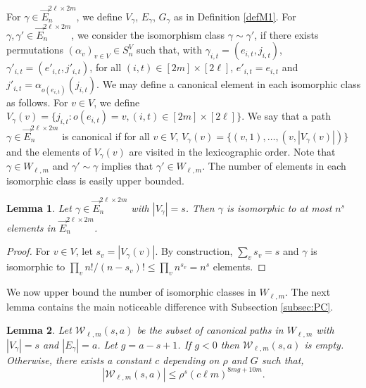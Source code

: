 \documentclass[11pt]{article}
\newtheorem{lemma}{Lemma}
\newcommand{\cW}{\mathcal {W}}
\newcommand{\1}{1\!\!{\sf I}}\newcommand{\IND}{\1}
\begin{document}
For $\gamma \in \vec E_n^{2 \ell \times 2m}$, we define $V_\gamma$, $E_\gamma$, $G_\gamma$ as in Definition \ref{defM1}.  For $\gamma, \gamma' \in \vec E_n^{2 \ell \times 2m}$, we consider the isomorphism class $\gamma \sim \gamma'$, if there exists permutations $(\alpha_v)_{v \in V} \in  S_n ^{V} $ such that, with $\gamma_{i,t} = (e_{i,t},j_{i,t})$, $\gamma'_{i,t} = (e'_{i,t},j'_{i,t})$,  for all $(i,t) \in [2m] \times [2\ell]$, $e'_{i,t} = e_{i,t}$ and $j'_{i,t} = \alpha_{o(e_{i,t})} ( j_{i,t})$.  We may define a canonical element in each isomorphic class as follows. For $v  \in V$, we define $V_\gamma (v) = \{ j_{i,t} : o(e_{i,t}) = v , (i,t) \in [2m] \times [2\ell] \}$.  We say that a path $\gamma \in \vec E_n^{2 \ell \times 2m}$ is canonical if for all $v \in V$, $V_\gamma (v)  = \{ (v,1), \ldots, (v,|V_\gamma(v)|) \}$  and the elements of $V_\gamma(v)$  are visited in the lexicographic order. Note that $\gamma \in W_{\ell,m}$ and $\gamma' \sim \gamma$ implies that $\gamma' \in W_{\ell,m}$. The number of elements in each isomorphic class is easily upper bounded.

\begin{lemma}\label{leM:isopath}
Let $\gamma \in \vec E_n^{2 \ell \times 2m}$ with $|V_\gamma| = s $. Then $\gamma$  is isomorphic to at most 
$
  n^s
$ 
elements in $\vec E_n^{2 \ell \times 2m}$.  
\end{lemma}

\begin{proof}
For $v \in V$, let $s_v = |V_\gamma (v)|$. By construction, $\sum_v s_v = s$ and $\gamma$ is isomorphic to 
$
\prod_v  n ! /(n - s_v) !   \leq \prod_v n^{s_v} = n ^s
$
elements.
\end{proof}


We now upper bound the number of isomorphic classes in $W_{\ell,m}$. The next lemma contains the main noticeable difference with Subsection \ref{subsec:PC}.

\begin{lemma}\label{leM:enumpath}
Let $\cW_{\ell,m} (s,a) $ be the subset of canonical paths in $W_{\ell,m}$ with $|V_\gamma| = s$ and $|E_\gamma |= a$. Let $g = a - s +1$. If $g < 0$ then $\cW_{\ell,m} (s,a)$ is empty. Otherwise,  there exists a constant $c$ depending on $\rho$ and $G$ such that, 
$$
| \cW _{\ell,m} (s,a) | \leq  \rho^{s} (c \ell  m )^{8 m g + 10 m}.
$$
\end{lemma}
\end{document}
